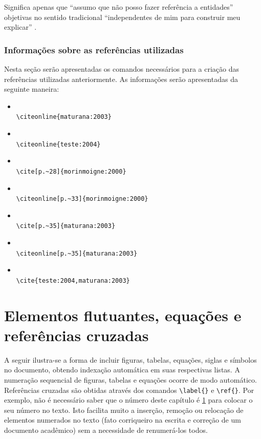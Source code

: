 Significa apenas que ``assumo que não posso fazer referência a entidades'' objetivas no sentido tradicional ``independentes de mim para construir meu explicar'' {}.

\subsection{Informações sobre as referências utilizadas}\label{referenciasUtilizadas}

Nesta seção serão apresentadas os comandos necessários para a criação das referências utilizadas anteriormente.
As informações serão apresentadas da seguinte maneira:

\begin{itemize}
    \item {}\\ \verb|\citeonline{maturana:2003}|
    \item {}\\ \verb|\citeonline{teste:2004}|
    \item \cite[p.~28]{morinmoigne:2000}\\ \verb|\cite[p.~28]{morinmoigne:2000}|
    \item {}\\ \verb|\citeonline[p.~33]{morinmoigne:2000}|
    \item \cite[p.~35]{maturana:2003}\\ \verb|\cite[p.~35]{maturana:2003}|
    \item {}\\ \verb|\citeonline[p.~35]{maturana:2003}|
    \item \cite{teste:2004,maturana:2003}\\ \verb|\cite{teste:2004,maturana:2003}|
\end{itemize}


%
%

\chapter{Elementos flutuantes, equações e referências cruzadas}
\label{chap:ef}

A seguir ilustra-se a forma de incluir figuras, tabelas, equações, siglas e 
símbolos no documento, obtendo indexação automática em suas respectivas
                listas.
A numeração sequencial de figuras, tabelas e equações ocorre de modo automático.
Referências cruzadas são obtidas através dos comandos \verb#\label{}# e \verb#\ref{}#.
Por exemplo, não é necessário saber que o número deste capítulo é \ref{chap:ef} para colocar o seu número no texto.
Isto facilita muito a inserção, remoção ou relocação de elementos numerados no texto (fato corriqueiro na escrita e correção de um documento acadêmico) sem a necessidade de renumerá-los todos.





